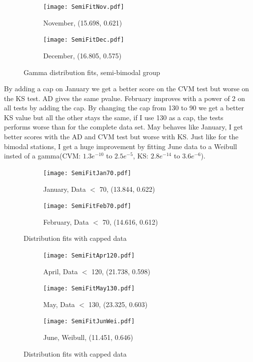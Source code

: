\documentclass{article}
\begin{document}
		\begin{figure}[H]
			\ContinuedFloat
			\centering
		\begin{subfigure}{0.5\textwidth}
			\texttt{[image: SemiFitNov.pdf]}
			\caption{November, (15.698, 0.621)}
		\end{subfigure}%
		\begin{subfigure}{0.5\textwidth}
			\texttt{[image: SemiFitDec.pdf]}
			\caption{December, (16.805, 0.575)}
		\end{subfigure}
		\caption{Gamma distribution fits, semi-bimodal group}
	\end{figure}
	By adding a cap on January we get a better score on the CVM test but worse on the KS test. AD gives the same pvalue. February improves with a power of 2 on all tests by adding the cap. By changing the cap from 130 to 90 we get a better KS value but all the other stays the same, if I use 130 as a cap, the tests performs worse than for the complete data set. May behaves like January, I get better scores with the AD and CVM test but worse with KS. Just like for the bimodal stations, I get a huge improvement by fitting June data to a Weibull insted of a gamma(CVM: $1.3e^{-10}$ to $2.5e^{-5}$, KS: $2.8e^{-14}$ to $3.6e^{-6}$). 
		\begin{figure}[H]
			\ContinuedFloat*
		\begin{subfigure}{0.5\textwidth}
			\centering
			\texttt{[image: SemiFitJan70.pdf]}
			\caption{January, Data $<$ 70, (13.844, 0.622)}
		\end{subfigure}%
		\begin{subfigure}{0.5\textwidth}
			\centering
			\texttt{[image: SemiFitFeb70.pdf]}
			\caption{February, Data $<$ 70, (14.616, 0.612)}
		\end{subfigure}
		\caption{Distribution fits with capped data}
		\label{SemiCap}
	\end{figure}
	\begin{figure}[H]
		\ContinuedFloat
		\begin{subfigure}{0.5\textwidth}
			\centering
			\texttt{[image: SemiFitApr120.pdf]}
			\caption{April, Data $<$ 120, (21.738, 0.598)}
		\end{subfigure}%
		\begin{subfigure}{0.5\textwidth}
			\centering
			\texttt{[image: SemiFitMay130.pdf]}
			\caption{May, Data $<$ 130, (23.325, 0.603)}
		\end{subfigure}
		\begin{subfigure}{0.5\textwidth}
			\centering
			\texttt{[image: SemiFitJunWei.pdf]}
			\caption{June, Weibull, (11.451, 0.646)}
		\end{subfigure}
		\caption{Distribution fits with capped data}
		\label{SemiCap}
	\end{figure}
\end{document}
